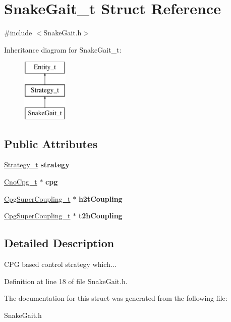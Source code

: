 \hypertarget{structSnakeGait__t}{
\section{SnakeGait\_\-t Struct Reference}
\label{structSnakeGait__t}
}


{\ttfamily \#include $<$SnakeGait.h$>$}

Inheritance diagram for SnakeGait\_\-t:\begin{figure}[H]
\begin{center}
\leavevmode
\includegraphics[height=3.000000cm]{structSnakeGait__t}
\end{center}
\end{figure}
\subsection*{Public Attributes}
\begin{DoxyCompactItemize}
\item 
\hypertarget{structSnakeGait__t_a89233be1e47444c82e71485eccccd3ec}{
\hyperlink{structStrategy__t}{Strategy\_\-t} {\bfseries strategy}}
\label{structSnakeGait__t_a89233be1e47444c82e71485eccccd3ec}

\item 
\hypertarget{structSnakeGait__t_aa2113e5e76d5d17387ae52f9cf0c9995}{
\hyperlink{structCnoCpg__t}{CnoCpg\_\-t} $\ast$ {\bfseries cpg}}
\label{structSnakeGait__t_aa2113e5e76d5d17387ae52f9cf0c9995}

\item 
\hypertarget{structSnakeGait__t_af93c4db9ad388a51b666f58a36538e78}{
\hyperlink{structCpgSuperCoupling__t}{CpgSuperCoupling\_\-t} $\ast$ {\bfseries h2tCoupling}}
\label{structSnakeGait__t_af93c4db9ad388a51b666f58a36538e78}

\item 
\hypertarget{structSnakeGait__t_ae7dba580e1bd4b3d12b501688c4db2c2}{
\hyperlink{structCpgSuperCoupling__t}{CpgSuperCoupling\_\-t} $\ast$ {\bfseries t2hCoupling}}
\label{structSnakeGait__t_ae7dba580e1bd4b3d12b501688c4db2c2}

\end{DoxyCompactItemize}


\subsection{Detailed Description}
CPG based control strategy which... 

Definition at line 18 of file SnakeGait.h.



The documentation for this struct was generated from the following file:\begin{DoxyCompactItemize}
\item 
SnakeGait.h\end{DoxyCompactItemize}

